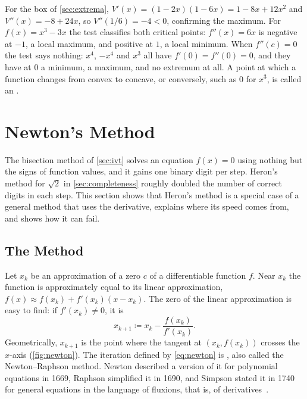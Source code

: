 For the box of \cref{sec:extrema}, $V'(x)=(1-2x)(1-6x)=1-8x+12x^2$ and $V''(x)=-8+24x$, so $V''(1/6)=-4<0$, confirming the maximum. For $f(x)=x^3-3x$ the test classifies both critical points: $f''(x)=6x$ is negative at $-1$, a local maximum, and positive at $1$, a local minimum. When $f''(c)=0$ the test says nothing: $x^4$, $-x^4$ and $x^3$ all have $f'(0)=f''(0)=0$, and they have at $0$ a minimum, a maximum, and no extremum at all. A point at which a function changes from convex to concave, or conversely, such as $0$ for $x^3$, is called an .

\section{Newton's Method}
\label{sec:newton}

The bisection method of \cref{sec:ivt} solves an equation $f(x)=0$ using nothing but the signs of function values, and it gains one binary digit per step. Heron's method for $\sqrt2$ in \cref{sec:completeness} roughly doubled the number of correct digits in each step. This section shows that Heron's method is a special case of a general method that uses the derivative, explains where its speed comes from, and shows how it can fail.

\subsection{The Method}

Let $x_k$ be an approximation of a zero $c$ of a differentiable function $f$. Near $x_k$ the function is approximately equal to its linear approximation, $f(x)\approx f(x_k)+f'(x_k)(x-x_k)$. The zero of the linear approximation is easy to find: if $f'(x_k)\ne0$, it is
\begin{equation}
x_{k+1}\coloneqq x_k-\frac{f(x_k)}{f'(x_k)} .
\label{eq:newton}
\end{equation}
Geometrically, $x_{k+1}$ is the point where the tangent at $(x_k,f(x_k))$ crosses the $x$-axis (\cref{fig:newton}). The iteration defined by \eqref{eq:newton} is , also called the Newton--Raphson method. Newton described a version of it for polynomial equations in 1669, Raphson simplified it in 1690, and Simpson stated it in 1740 for general equations in the language of fluxions, that is, of derivatives~\cite{ypma1995}.

